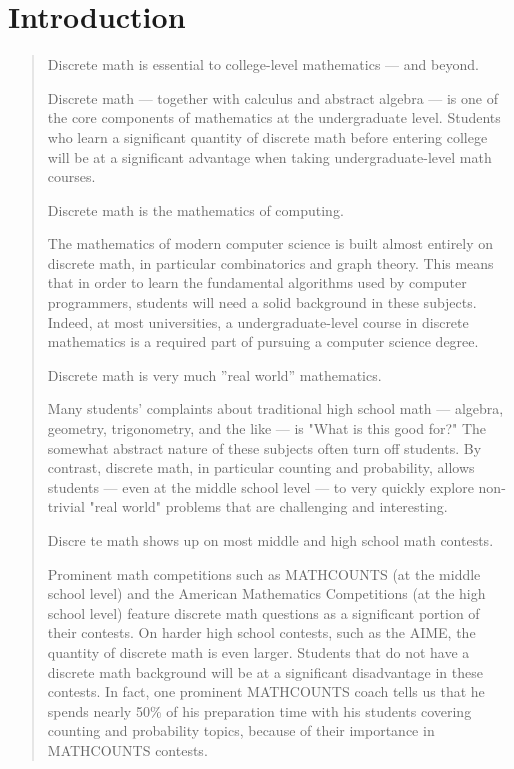 \documentclass[letterpaper, twoside]{tufte-book}
\begin{document}
\chapter*{Introduction}
\begin{quote}

\vspace*{0.25cm}
\noindent
{\large\color{blue}Discrete math is essential to college-level mathematics --- 
and beyond.}

Discrete math --- together with calculus and abstract algebra --- is one of the core
 components of mathematics at the undergraduate level. Students who learn a significant
 quantity of discrete math before entering college will be at a significant advantage
 when taking undergraduate-level math courses.

\vspace*{0.25cm}
\noindent
{\large\color{blue}Discrete math is the mathematics of computing.}

The mathematics of modern computer science is built almost entirely on discrete math,
 in particular combinatorics and graph theory. This means that in order to learn the
 fundamental algorithms used by computer programmers, students will need a solid
 background in these subjects. Indeed, at most universities, a undergraduate-level
 course in discrete mathematics is a required part of pursuing a computer science
 degree.

\vspace*{0.25cm}
\noindent
{\large\color{blue}Discrete math is very much ''real world'' mathematics.}

Many students' complaints about traditional high school math --- algebra, geometry,
 trigonometry, and the like --- is "What is this good for?" The somewhat abstract
 nature of these subjects often turn off students. By contrast, discrete math, in
 particular counting and probability, allows students --- even at the middle school
 level --- to very quickly explore non-trivial "real world" problems that are
 challenging and interesting.

\clearpage
\noindent
{\large\color{blue}Discre te math shows up on most middle and high school math contests.}

Prominent math competitions such as MATHCOUNTS (at the middle school level) and the
 American Mathematics Competitions (at the high school level) feature discrete math
 questions as a significant portion of their contests. On harder high school contests,
 such as the AIME, the quantity of discrete math is even larger. Students that do not
 have a discrete math background will be at a significant disadvantage in these
 contests. In fact, one prominent MATHCOUNTS coach tells us that he spends nearly
 50\% of his preparation time with his students covering counting and probability
 topics, because of their importance in MATHCOUNTS contests.


\end{quote}
\end{document}
